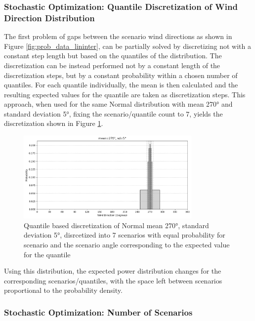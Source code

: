 \subsubsection{Stochastic Optimization: Quantile Discretization of Wind Direction Distribution }

The first problem of gaps between the scenario wind directions as shown in Figure \ref{fig:prob_data_lininter}, can be partially solved by discretizing not with a constant step length but based on the quantiles of the distribution. The discretization can be instead performed not by a constant length of the discretization steps, but by a constant probability within a chosen number of quantiles. For each quantile individually, the mean is then calculated and the resulting expected values for the quantile are taken as discretization steps. This approach, when used for the same Normal distribution with mean 270° and standard deviation 5°, fixing the scenario/quantile count to 7, yields the discretization shown in Figure \ref{fig:wind_dist_opti_quantiles}. 

\begin{figure}[h] 
	\centering
	\includegraphics[width=0.8\textwidth]{figures/optimization/wind_dist_opti_quantiles.png} 
	\caption{Quantile based discretization of Normal mean 270°,  standard deviation 5°, disrcetized into 7 scenarios with equal probability for scenario and the scenario angle corresponding to the expected value for the quantile }
	\label{fig:wind_dist_opti_quantiles}
\end{figure} 

Using this distribution, the expected power distribution changes for the corresponding scenarios/quantiles, with the space left between scenarios proportional to the probability density.

\subsubsection{Stochastic Optimization: Number of Scenarios}


